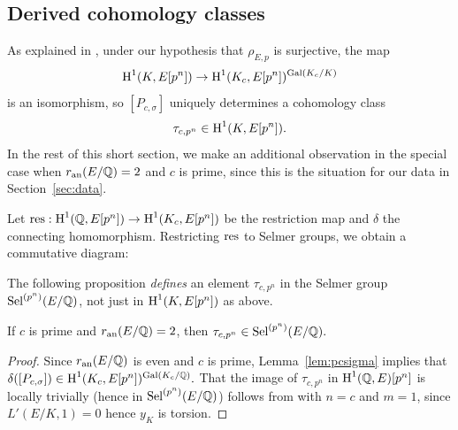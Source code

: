 \documentclass{article} \usepackage[active]{srcltx}
\begin{document}
\subsection{Derived cohomology classes}\label{sec:derclass}

As explained in \cite[\S4]{gross:kolyvagin}, under our hypothesis that
$\rho_{E,p}$ is surjective, the map
$$
  \operatorname{H}^1(K,E[p^n]) \to \operatorname{H}^1(K_c, E[p^n])^{\operatorname{Gal}(K_c/K)}
$$ 
is an isomorphism, so $[P_{c,\sigma}]$ uniquely determines a
cohomology class 
$$\tau_{c,p^n} \in \operatorname{H}^1(K, E[p^n]).$$  In the rest of
this short section, we make an additional observation in the special
case when $r_{{\rm an}}(E/\mathbb{Q})=2$ and $c$ is prime, since this is the
situation for our data in Section~\ref{sec:data}.

Let $\operatorname{res}:\operatorname{H}^1(\mathbb{Q},E[p^n])\to \operatorname{H}^1(K_c,E[p^n])$ be the restriction map and
$\delta$ the connecting homomorphism.  Restricting $\operatorname{res}$ to Selmer
groups, we obtain a commutative diagram:
\begin{center}
\end{center}

The following proposition {\em defines} an element $\tau_{c,p^n}$
in the Selmer group $\operatorname{Sel}^{(p^n)}(E/\mathbb{Q})$, not just in $\operatorname{H}^1(K,E[p^n])$
as above. %
\begin{proposition} 
If $c$ is prime and $r_{{\rm an}}(E/\mathbb{Q})=2$, then
$
 \tau_{c,p^n} \in \operatorname{Sel}^{(p^n)}(E/\mathbb{Q}).
$
\end{proposition}
\begin{proof} 
Since $r_{{\rm an}}(E/\mathbb{Q})$ is even and $c$ is prime, Lemma~\ref{lem:pcsigma} implies that
  $\delta([P_{c,\sigma}]) \in \operatorname{H}^1(K_c, E[p^n])^{\operatorname{Gal}(K_c/\mathbb{Q})}.$ 
That the image of
  $\tau_{c,p^n}$ in $\operatorname{H}^1(\mathbb{Q},E)[p^n]$ is locally trivially
  (hence in $\operatorname{Sel}^{(p^n)}(E/\mathbb{Q})$) follows from
  \cite[Prop.~6.2]{gross:kolyvagin} with $n=c$ and $m=1$, since
  $L'(E/K,1)=0$ hence $y_K$ is torsion.
\end{proof}
\end{document}
